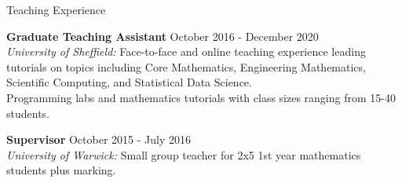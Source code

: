 \documentclass{resume} %
\begin{document}
\begin{rSection}{Teaching Experience}

	{\bf Graduate Teaching Assistant} \hfill October 2016 - December 2020 \\
	{\em University of Sheffield:} Face-to-face and online teaching experience leading tutorials on topics including Core Mathematics, Engineering Mathematics, Scientific Computing, and Statistical Data Science. \\
	Programming labs and mathematics tutorials with class sizes ranging from 15-40 students.

	{\bf Supervisor} \hfill October 2015 - July 2016 \\
	{\em University of Warwick:} Small group teacher for 2x5 1st year mathematics students plus marking. \\


\end{rSection}

\end{document}
